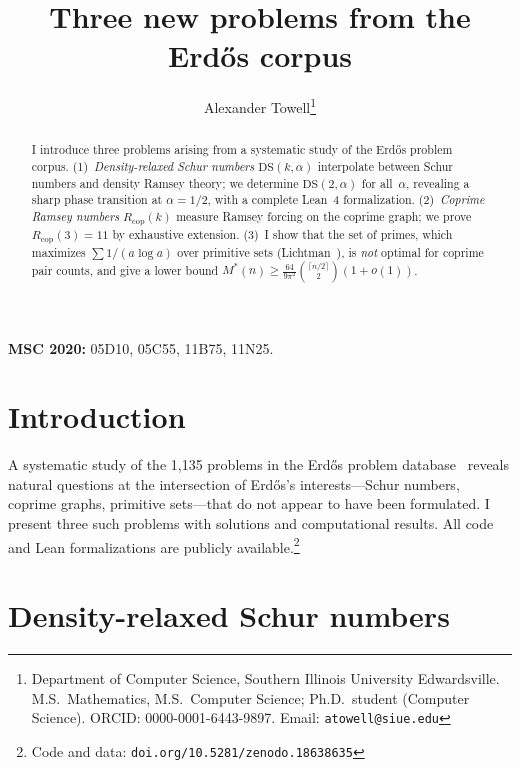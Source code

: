 \documentclass[11pt]{article}
\theoremstyle{plain}
\theoremstyle{definition}
\newcommand{\DS}{\mathrm{DS}}
\newcommand{\Rcop}{R_{\mathrm{cop}}}
\begin{document}
\title{Three new problems from the Erd\H{o}s corpus}

\author{Alexander Towell\thanks{Department of Computer Science,
Southern Illinois University Edwardsville.
M.S.\ Mathematics, M.S.\ Computer Science; Ph.D.\ student (Computer Science).
ORCID: 0000-0001-6443-9897.
Email: \texttt{atowell@siue.edu}}}

\date{}
\maketitle

\begin{abstract}
I introduce three problems arising from a systematic study of the
Erd\H{o}s problem corpus. (1)~\emph{Density-relaxed Schur numbers}
$\DS(k,\alpha)$ interpolate between Schur numbers and density Ramsey
theory; we determine $\DS(2,\alpha)$ for all~$\alpha$, revealing a
sharp phase transition at $\alpha=1/2$, with a complete Lean~4
formalization.
(2)~\emph{Coprime Ramsey numbers} $\Rcop(k)$ measure Ramsey forcing
on the coprime graph; we prove $\Rcop(3)=11$ by exhaustive extension.
(3)~I show that the set of primes, which maximizes $\sum 1/(a\log a)$
over primitive sets (Lichtman~\cite{lichtman2023}), is \emph{not}
optimal for coprime pair counts, and give a lower bound
$M^*(n)\ge\frac{64}{9\pi^2}\binom{\lceil n/2\rceil}{2}(1+o(1))$.
\end{abstract}

\smallskip\noindent\textbf{MSC 2020:} 05D10, 05C55, 11B75, 11N25.

\section{Introduction}\label{sec:intro}

A systematic study of the 1{,}135 problems in the Erd\H{o}s problem
database~\cite{tao2025erdos} reveals natural questions at the
intersection of Erd\H{o}s's interests---Schur numbers, coprime graphs,
primitive sets---that do not appear to have been formulated. I present
three such problems with solutions and computational results. All code
and Lean formalizations are publicly available.\footnote{Code and data:
\texttt{doi.org/10.5281/zenodo.18638635}}

\section{Density-relaxed Schur numbers}\label{sec:ds}
\end{document}

